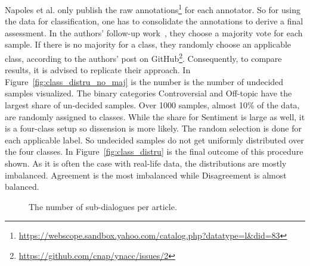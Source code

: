 Napoles et al. only publish the raw annotations\footnote{\url{https://webscope.sandbox.yahoo.com/catalog.php?datatype=l&did=83}} for each annotator.
So for using the data for classification, one has to consolidate the annotations to derive a final assessment.
In the authors' follow-up work~\cite{napoles2017automatically}, they choose a majority vote for each sample. If there is no majority for a class, they randomly choose an applicable class, according to the authors' post on GitHub\footnote{\url{https://github.com/cnap/ynacc/issues/2}}. Consequently, to compare results, it is advised to replicate their approach.
In Figure~\ref{fig:class_distru_no_maj} is the number is the number of undecided samples visualized.
The binary categories Controversial and Off-topic have the largest share of un-decided samples.
Over 1000 samples, almost 10\% of the data, are randomly assigned to classes.
While the share for Sentiment is large as well, it is a four-class setup so dissension is more likely.
The random selection is done for each applicable label.
So undecided samples do not get uniformly distributed over the four classes.
In Figure~\ref{fig:class_distru} is the final outcome of this procedure shown.
As it is often the case with real-life data, the distributions are mostly imbalanced.
Agreement is the most imbalanced while Disagreement is almost balanced.

\begin{figure}
    \centering
    \caption{The number of sub-dialogues per article.}
    \label{fig:threads_per_article}
\end{figure}


